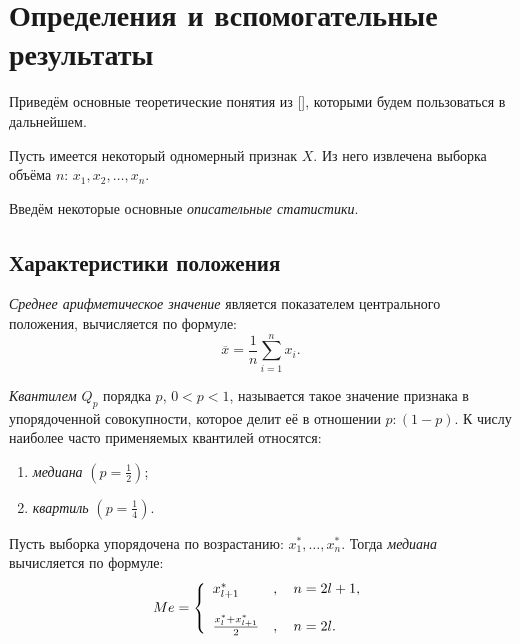 \newpage
\chapter{Определения и вспомогательные результаты}

Приведём основные теоретические понятия из [], которыми будем пользоваться в дальнейшем.

Пусть имеется некоторый одномерный признак $X$. Из него извлечена выборка объёма $n$: $x_1, x_2, \ldots, x_n$.

Введём некоторые основные \textit{описательные статистики}.

\section*{Характеристики положения} %
\label{sec:chars_pos}

\textit{Среднее арифметическое значение} является показателем 
центрального положения, вычисляется по формуле:
\begin{equation*}
	\overline{x} = \frac{1}{n} \sum_{i=1}^n{x_i}.
\end{equation*}

\textit{Квантилем $Q_p$} порядка $p$, $0<p<1$, называется такое значение признака в упорядоченной совокупности, которое делит её в отношении $p: (1 - p)$. К числу наиболее часто применяемых квантилей относятся:
\begin{enumerate}
	\item \textit{медиана} $(p = \frac{1}{2})$;
	\item \textit{квартиль} $(p = \frac{1}{4})$.
\end{enumerate}

Пусть выборка упорядочена по возрастанию: $x_{1}^{*}, \ldots, x_{n}^{*}$. Тогда \textit{медиана} вычисляется по формуле:
\begin{equation*}
Me = \left\{
 \begin{array}{l l}
   x_{l+1}^{*} &, \quad n = 2l + 1, \\
   \\
   \frac{x_l^{*} + x_{l+1}^{*}}{2} &, \quad n = 2l.
 \end{array} \right.
\end{equation*}


